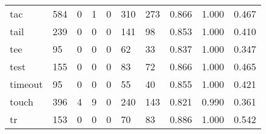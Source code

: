 \begin{longtable}{lp{1.3cm}p{1.3cm}p{1.3cm}p{1.3cm}p{1.3cm}p{1.3cm}p{1.3cm}p{1.3cm}p{1.3cm}}
tac       &                    584 &                                             0 &                                            1 &                                           0 &                                          310 &                                        273 &                                0.866 &                                  1.000 &                                0.467 \\
tail      &                    239 &                                             0 &                                            0 &                                           0 &                                          141 &                                         98 &                                0.853 &                                  1.000 &                                0.410 \\
tee       &                     95 &                                             0 &                                            0 &                                           0 &                                           62 &                                         33 &                                0.837 &                                  1.000 &                                0.347 \\
test      &                    155 &                                             0 &                                            0 &                                           0 &                                           83 &                                         72 &                                0.866 &                                  1.000 &                                0.465 \\
timeout   &                     95 &                                             0 &                                            0 &                                           0 &                                           55 &                                         40 &                                0.855 &                                  1.000 &                                0.421 \\
touch     &                    396 &                                             4 &                                            9 &                                           0 &                                          240 &                                        143 &                                0.821 &                                  0.990 &                                0.361 \\
tr        &                    153 &                                             0 &                                            0 &                                           0 &                                           70 &                                         83 &                                0.886 &                                  1.000 &                                0.542 \\

\end{longtable}
